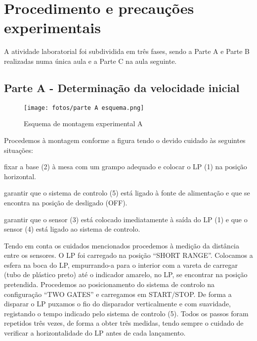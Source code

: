 \documentclass{report}
\begin{document}
\section{Procedimento e precauções experimentais}
A atividade laboratorial foi subdividida em três fases, sendo a Parte A e Parte B realizadas numa única aula e a Parte C na aula seguinte.
\subsection{Parte A - Determinação da velocidade inicial}
\begin{figure}[H]
\centering
\texttt{[image: fotos/parte A esquema.png]}
\caption{Esquema de montagem experimental A}
\end{figure}
Procedemos à montagem conforme a figura tendo o devido cuidado às seguintes situações:
\begin{paragrafoenum}
\item  fixar a base (2) à mesa com um grampo adequado e colocar o LP (1) na posição horizontal.
\item garantir que o sistema de controlo (5) está ligado à fonte de alimentação e que se encontra na posição de desligado (OFF).
\item garantir que o sensor (3) está colocado imediatamente à saída do LP (1) e que o sensor (4) está ligado ao sistema de controlo.
\end{paragrafoenum}
Tendo em conta os cuidados mencionados procedemos à medição da distância entre os sensores. O LP foi carregado na posição “SHORT RANGE”. Colocamos a esfera na boca do LP, empurrando-a para o interior com a vareta de carregar (tubo de plástico preto) até o indicador amarelo, no LP, se encontrar na posição pretendida. Procedemos ao posicionamento do sistema de controlo na configuração “TWO GATES” e carregamos em START/STOP. De forma a disparar o LP puxamos o fio do disparador verticalmente e com suavidade, registando o tempo
indicado pelo sistema de controlo (5). Todos os passos foram repetidos três vezes, de forma a obter três medidas, tendo sempre o cuidado de verificar a horizontalidade do LP antes de cada lançamento.
\end{document}
